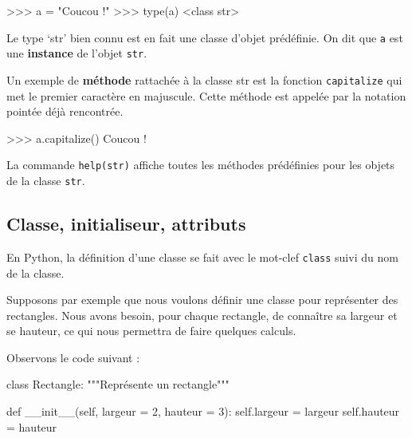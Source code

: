 \documentclass[
  letterpaper,
  DIV=11,
  numbers=noendperiod]{scrartcl}
\newenvironment{Shaded}{\begin{snugshade}}{\end{snugshade}}
\newcommand{\BuiltInTok}[1]{\textcolor[rgb]{0.00,0.23,0.31}{#1}}
\newcommand{\CommentTok}[1]{\textcolor[rgb]{0.37,0.37,0.37}{#1}}
\newcommand{\DecValTok}[1]{\textcolor[rgb]{0.68,0.00,0.00}{#1}}
\newcommand{\FunctionTok}[1]{\textcolor[rgb]{0.28,0.35,0.67}{#1}}
\newcommand{\KeywordTok}[1]{\textcolor[rgb]{0.00,0.23,0.31}{#1}}
\newcommand{\NormalTok}[1]{\textcolor[rgb]{0.00,0.23,0.31}{#1}}
\newcommand{\OperatorTok}[1]{\textcolor[rgb]{0.37,0.37,0.37}{#1}}
\newcommand{\StringTok}[1]{\textcolor[rgb]{0.13,0.47,0.30}{#1}}
\newcommand{\VariableTok}[1]{\textcolor[rgb]{0.07,0.07,0.07}{#1}}
\begin{document}
\begin{Shaded}
\begin{Highlighting}[]
\OperatorTok{\textgreater{}\textgreater{}\textgreater{}}\NormalTok{ a }\OperatorTok{=} \StringTok{"Coucou !"}
\OperatorTok{\textgreater{}\textgreater{}\textgreater{}} \BuiltInTok{type}\NormalTok{(a)}
\OperatorTok{\textless{}}\KeywordTok{class} \StringTok{\textquotesingle{}str\textquotesingle{}}\OperatorTok{\textgreater{}}
\end{Highlighting}
\end{Shaded}

Le type `str' bien connu est en fait une classe d'objet prédéfinie. On
dit que \texttt{a} est une \textbf{instance} de l'objet \texttt{str}.

Un exemple de \textbf{méthode} rattachée à la classe str est la fonction
\texttt{capitalize} qui met le premier caractère en majuscule. Cette
méthode est appelée par la notation pointée déjà rencontrée.

\begin{Shaded}
\begin{Highlighting}[]
\OperatorTok{\textgreater{}\textgreater{}\textgreater{}}\NormalTok{ a.capitalize()}
\CommentTok{\textquotesingle{}Coucou !\textquotesingle{}}
\end{Highlighting}
\end{Shaded}

La commande \texttt{help(str)} affiche toutes les méthodes prédéfinies
pour les objets de la classe \texttt{str}.

\hypertarget{classe-initialiseur-attributs}{%
\subsection{Classe, initialiseur,
attributs}\label{classe-initialiseur-attributs}}

En Python, la définition d'une classe se fait avec le mot-clef
\texttt{class} suivi du nom de la classe.

Supposons par exemple que nous voulons définir une classe pour
représenter des rectangles. Nous avons besoin, pour chaque rectangle, de
connaître sa largeur et se hauteur, ce qui nous permettra de faire
quelques calculs.

Observons le code suivant :

\begin{Shaded}
\begin{Highlighting}[]
\KeywordTok{class}\NormalTok{ Rectangle:}
    \CommentTok{"""Représente un rectangle"""}
    
    \KeywordTok{def} \FunctionTok{\_\_init\_\_}\NormalTok{(}\VariableTok{self}\NormalTok{, largeur }\OperatorTok{=} \DecValTok{2}\NormalTok{, hauteur }\OperatorTok{=} \DecValTok{3}\NormalTok{):}
        \VariableTok{self}\NormalTok{.largeur }\OperatorTok{=}\NormalTok{ largeur}
        \VariableTok{self}\NormalTok{.hauteur }\OperatorTok{=}\NormalTok{ hauteur}
\end{Highlighting}
\end{Shaded}
\end{document}
